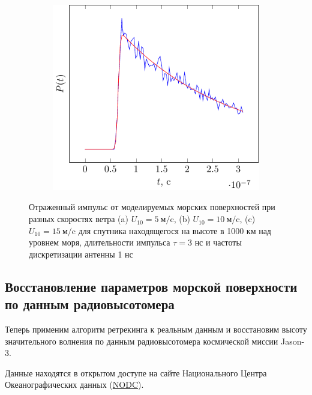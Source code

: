 \begin{figure}[H]
\begin{subfigure}{0.49\linewidth}
    \end{subfigure}
    \begin{subfigure}{0.49\linewidth}
        \centering
        \includegraphics[width=\linewidth,page=2]{fig/retracking/model}
    \end{subfigure}
    \caption{Отраженный импульс от моделируемых морских поверхностей при разных
    скоростях ветра (a) $U_{10}=5 ~\text{м}/\text{c}$, (b) $U_{10}=10
~\text{м}/\text{c}$, (c) $U_{10}=15 ~\text{м}/\text{c}$ для спутника
находящегося на высоте в 1000 км над уровнем моря, длительности импульса $\tau
= 3$ нс и частоты дискретизации антенны 1 нс}
    \label{fig:model_pulse_retracking}
\end{figure}






\subsection{Восстановление параметров морской поверхности по данным
радиовысотомера}


Теперь применим алгоритм ретрекинга к реальным данным и восстановим высоту
значительного волнения по данным радиовысотомера космической миссии Jason-3. 

Данные находятся в открытом доступе на сайте Национального Центра
Океанографических данных
(\href{https://data.nodc.noaa.gov/jason3/gdr}{NODC}). 


